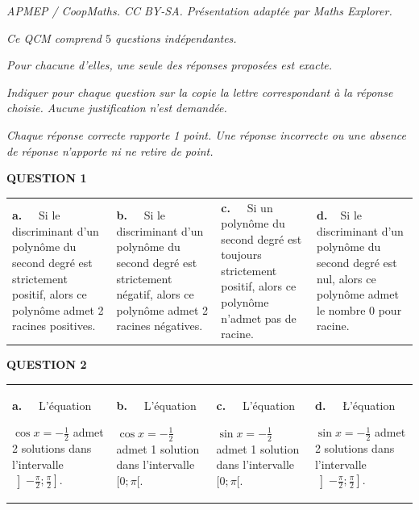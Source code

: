 \documentclass[10pt]{article}
\begin{document}
\noindent\textit{APMEP / CoopMaths. CC BY-SA. Présentation adaptée par Maths Explorer.}\par\medskip
\medskip

\emph{Ce QCM comprend $5$ questions indépendantes.}

\emph{Pour chacune d'elles, une seule des réponses proposées est exacte.}

\emph{Indiquer pour chaque question sur la copie la lettre correspondant à la réponse
choisie. Aucune justification n'est demandée.}

\emph{Chaque réponse correcte rapporte 1 point. Une réponse incorrecte ou une absence de réponse n'apporte ni ne retire de point.}

\medskip

\textbf{QUESTION 1}

\medskip

\begin{tabularx}{\linewidth}{*{4}{X}}
\textbf{a.~~} Si le discriminant
d'un polynôme
du second degré
est strictement
positif, alors ce
polynôme admet
2 racines
positives.&
\textbf{b.~~} Si le discriminant
d'un polynôme
du second degré
est strictement
négatif, alors ce
polynôme admet
2 racines
négatives.&
\textbf{c.~~} Si un polynôme
du second degré
est toujours
strictement
positif, alors ce
polynôme
n'admet pas de
racine.&
\textbf{d.~~}Si le discriminant
d'un polynôme
du second degré
est nul, alors ce
polynôme admet
le nombre 0 pour
racine.
\end{tabularx}

\medskip

\textbf{QUESTION 2}

\medskip

\begin{tabularx}{\linewidth}{*{4}{X}}
\begin{minipage}[t]{3.5cm}\textbf{a.~~}
L'équation

 $\cos x =-\frac{1}{2}$
admet 2 solutions dans l'intervalle
 $\left]-\frac{\pi}{2};\frac{\pi}{2}\right]$.
\end{minipage}&
\begin{minipage}[t]{3.5cm}\textbf{b.~~}
 L'équation
 
$\cos x= -\frac{1}{2}$
admet 1
solution dans
l'intervalle $[0 ; \pi[$.
\end{minipage}&
 \begin{minipage}[t]{3.5cm}\textbf{c.~~}
L'équation

$\sin x = -\frac{1}{2}$ admet 1
solution dans
l'intervalle \mbox{$[0 ; \pi[$}.
\end{minipage}&
 \begin{minipage}[t]{3.5cm}\textbf{d.~~}
\L'équation

$\sin x= -\frac{1}{2}$ admet 2
solutions dans
l'intervalle $\left]-\frac{\pi}{2} ;\frac{\pi}{2}\right]$.
\end{minipage}
\end{tabularx}
\end{document}
